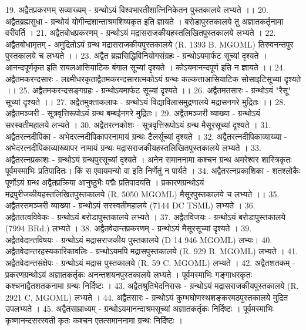 19. अद्वैतप्रकरणम् सव्याख्यम् -
	ग्रन्थोऽयं विश्वभारतीशात्निनिकेतन पुस्तकालये लभ्यते ।। 
20. अद्वैतब्रह्मसुधा - 
	ग्रन्थोयं योगीन्द्रशान्ताश्रमशिष्यकृत इति ज्ञायते । बरोडापुस्तकालये तु अज्ञातकर्तृनामा वरींवर्ति । 
21. अद्वैतबोधप्रकरणम् -
	ग्रन्थोऽयं मद्रासराजकीयहस्तलिखितपुस्तकालये लभ्यते । 
22. अद्वैतबोधामृतम् -
	अमुद्रितोऽयं ग्रन्थ मद्रासराजकीयपुस्तकालये (R. 1393 B. MGOML) तिरुवनन्तपुर पुस्तकालये च लभ्यते ।। 
23. अद्वैत ब्रह्मसिद्धिविनियोगसंग्रहः -
	ग्रन्थोऽयमार्फट सूच्यां दृश्यते । आनन्दपूर्णकृत इति रायलआसियाटिक बंगाल सूच्यां दृश्यते । कोऽयमानन्दपूर्ण इति न ज्ञायते ।।
24. अद्वैतमकरन्दसारः - 
	लक्ष्मीधरकृताद्वैतमकरन्दसारात्मकोऽयं ग्रन्थः कल्कत्ताआसियाटिक सोसाइटिसूच्यां दृश्यते ।। 
25. अद्वैतमकरन्दसङ्गग्रहः - ग्रन्थोऽयमार्फट सूच्यां दृश्यते ।।
26. अद्वैतमतसारः - ग्रन्थोऽयं "रैसू" सूच्यां दृश्यते ।।
27. अद्वैतमुक्ताकलापः - ग्रन्थोऽयं विद्याविलासमुद्रणालये मद्रासनगरे मुद्रितः ।। 
28. अद्वैतमञ्जरी - सूत्रवृत्तिरूपोऽयं ग्रन्थ बम्बईनगरे मुद्रितः।
29. अद्वैतमञ्जरी व्याख्या - ग्रन्थोऽयं सरस्वतीमहालये लभ्यते ।
30. अद्वैतरत्नकोशः - सूत्रवृत्तिरूपोऽयं ग्रन्थ मैसूरसूच्यां दृश्यते । 
31. अद्वैतरत्नदीपिका - अभेदरत्नदीपिकापरनामायं ग्रन्थः टैलर्सूच्यां दृश्यते ।
32. अद्वैतरत्नदीपिकाव्याख्या - अभेदरत्नदीपिकाव्याख्यापर नामायं ग्रन्थः मद्रासराजकीयहस्तलिखितपुस्तकालये लभ्यते । 
33. अद्वैतरत्नप्रकाशः - 
	ग्रन्थोऽयं ग्रन्थपुरसूच्यां दृश्यते । अनेन समाननामा कश्चन ग्रन्थ अमरेश्वर शास्त्रिकृतः पूर्वमस्माभिः प्रतिपादितः। किं स एवायमन्यो वा इति निर्णेतुं न पार्यते । 
34. अद्वैतरत्नप्रकाशिका -
	शतश्लोकैः पूर्णोऽयं ग्रन्थ अद्वैतप्रक्रिया आनुष्ठुभैः पद्मैः प्रतिपादयति । प्रकारणग्रन्थोऽयं मद्रपुरीजकीयहस्तलिखितपुस्तकालये (R. 5050 MGOML) मैसूरपुस्तकालये च लभ्यते ।। 
35. अद्वैतरसमञ्जरी व्याख्या - ग्रन्थोऽयं सरस्वतीमहालये (7144 DC TSML) लभ्यते । 
36. अद्वैततत्वविवेकः - ग्रन्थोऽयं बरोडापुस्तकालये लभ्यते । 
37. अद्वैतविजयः - ग्रन्थोऽयं बरोडापुस्तकालये (7994 BRd.) लभ्यते । 
38. अद्वैतवेदान्तप्रकरणम् - ग्रन्थोऽयं मैसूरसूच्यां दृश्यते ।
39. अद्वैतवेदान्तविषयः - ग्रन्थोऽयं मद्रासराजकीय पुस्तकालये (D 14 946 MGOML) लभ्यः। 
40. अद्वैतवेदान्तरहस्यकारिकावलिः - ग्रन्थोऽयमपि मद्रासपुस्तकालये (R. 929 B. MGOML) लभ्यते । 
41. अद्वैतवेदान्तसंक्षेपः - ग्रन्थोऽयं मद्रास पुस्तकालये (R. 59 C. MGOML) लभ्यते । 
42. अद्वैतशतकम् - 
	प्रकरणग्रन्थोऽयं अज्ञातकर्तृकः अनन्तशयनपुस्तकालये लभ्यते । पूर्वमस्माभिः गङ्गाधरकृतः कश्चनाद्वैतशतकनामा ग्रन्थः निर्दिष्टः ।
43. अद्वैतश्रुतिभेदनिरासः -
	ग्रन्थोऽयं मद्रासराजकीयपुस्तकालये (R. 2921 C, MGOML) लभ्यते ।
44. अद्वैतसारः -
	ग्रन्थोऽयं कुम्भघोणस्थशङ्करमठपुस्तकालये मुद्रित उपलभ्यते । 
45. अद्वैतसाम्राध्यम् - 
	ग्रन्थोऽयमानन्दाश्रमसूच्यां अज्ञातकर्तृकः निर्दिष्टः । पूर्वमस्माभिः कृष्णानन्दसरस्वती कृतः कश्चन एतत्समाननामा ग्रन्थः निर्दिष्टः । 
